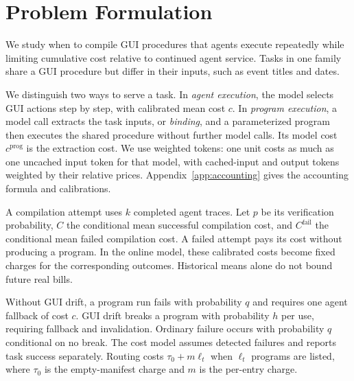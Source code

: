 \section{Problem Formulation}
\label{sec:formulation}

We study when to compile GUI procedures that agents execute repeatedly while limiting cumulative cost relative to continued agent service.
Tasks in one family share a GUI procedure but differ in their inputs, such as event titles and dates.

We distinguish two ways to serve a task.
In \emph{agent execution}, the model selects GUI actions step by step, with calibrated mean cost $c$.
In \emph{program execution}, a model call extracts the task inputs, or \emph{binding}, and a parameterized program then executes the shared procedure without further model calls.
Its model cost $c^{\mathrm{prog}}$ is the extraction cost.
We use weighted tokens: one unit costs as much as one uncached input token for that model, with cached-input and output tokens weighted by their relative prices.
Appendix~\ref{app:accounting} gives the accounting formula and calibrations.

A compilation attempt uses $k$ completed agent traces.
Let $p$ be its verification probability, $C$ the conditional mean successful compilation cost, and $C^{\mathrm{fail}}$ the conditional mean failed compilation cost.
A failed attempt pays its cost without producing a program.
In the online model, these calibrated costs become fixed charges for the corresponding outcomes.
Historical means alone do not bound future real bills.

Without GUI drift, a program run fails with probability $q$ and requires one agent fallback of cost $c$.
GUI drift breaks a program with probability $h$ per use, requiring fallback and invalidation.
Ordinary failure occurs with probability $q$ conditional on no break.
The cost model assumes detected failures and reports task success separately.
Routing costs $\tau_0+m\ell_t$ when $\ell_t$ programs are listed, where $\tau_0$ is the empty-manifest charge and $m$ is the per-entry charge.

